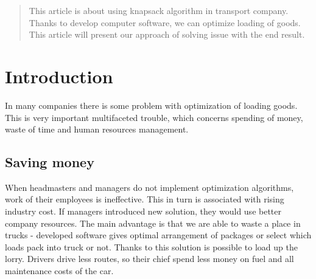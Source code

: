 \documentclass[conference,compsoc]{IEEEtran}
\begin{document}




\maketitle

\begin{abstract}
This article is about using knapsack algorithm in transport company. Thanks to develop computer software, we can optimize loading of goods. This article will present our approach of solving issue with the end result.
\end{abstract}





%
\IEEEpeerreviewmaketitle



\section{Introduction}
In many companies there is some problem with optimization of loading goods. This is very important multifaceted trouble, which concerns spending of money, waste of time and human resources management.

\subsection{Saving money}
When headmasters and managers do not implement optimization algorithms, work of their employees is ineffective. This in turn is associated with rising industry cost. If managers introduced new solution, they would use better company resources. %
The main advantage is that we are able to waste a place in trucks - developed software gives optimal arrangement of packages or select which loads pack into truck or not. Thanks to this solution is possible  to load up the lorry. Drivers drive less routes, so their chief spend less money on fuel and all maintenance costs of the car.
\end{document}
